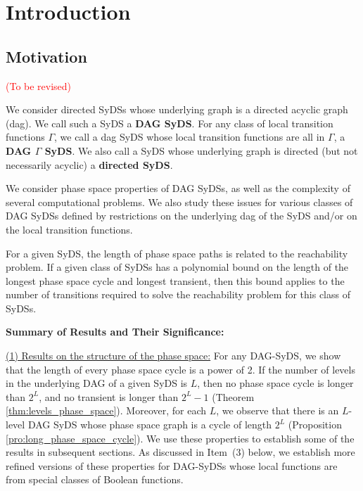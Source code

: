 \section{Introduction}
\label{sec:intro}

\subsection{Motivation}
\label{sse:motivation}

\textcolor{red}{(To be revised)}

We consider directed SyDSs whose underlying graph is a directed
acyclic graph (dag).  We call such a SyDS a {\bf DAG SyDS}.  For
any class of local transition functions $\Gamma$, we call a dag
SyDS whose local transition functions are all in  $\Gamma$, a {\bf
DAG $\Gamma$ SyDS}.  We also call a SyDS whose underlying graph is
directed (but not necessarily acyclic) a {\bf directed SyDS}.


We consider phase space properties of DAG  SyDSs, as well as the
complexity of several computational problems.  We also study these
issues for various classes of DAG  SyDSs defined by restrictions
on the underlying dag of the SyDS and/or on the local transition
functions.

For a given SyDS, the length of  phase space paths is related to
the reachability problem.  If a given class of SyDSs has a polynomial
bound on the length of the longest phase space cycle and longest
transient, then this bound applies to the number of transitions
required to solve the reachability problem for this class of SyDSs.


\noindent
\textbf{Summary of Results and Their Significance:}

\smallskip

\noindent
\underline{(1) Results on the structure of the phase space:}
For any DAG-SyDS, we show that
the length of every phase space cycle is a power of 2.
If the number of levels in the underlying DAG of a given SyDS is $L$,
then no phase space cycle is longer than $2^L$,
and no transient is longer than $2^L-1$
(Theorem \ref{thm:levels_phase_space}).
Moreover, for each $L$, we observe that
there is an $L$-level DAG SyDS whose phase 
space graph is a cycle of length $2^L$
(Proposition \ref{pro:long_phase_space_cycle}).
We use these properties to establish some of
the results in subsequent sections.
As discussed in Item~(3) below, we establish more refined versions
of these properties for DAG-SyDSs whose local functions are from
special classes of Boolean functions.

